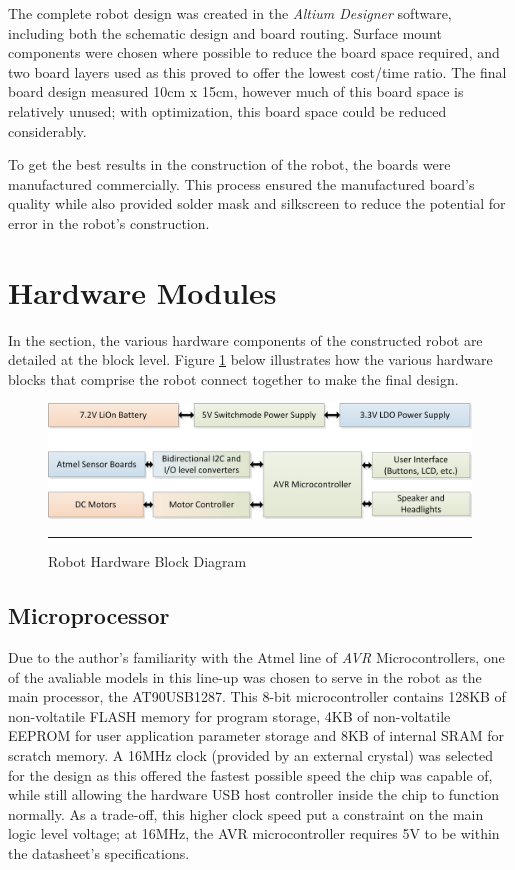 The complete robot design was created in the \textit{Altium Designer} software, including both the schematic design and board routing. Surface mount components were chosen where possible to reduce the board space required, and two board layers used as this proved to offer the lowest cost/time ratio. The final board design measured 10cm x 15cm, however much of this board space is relatively unused; with optimization, this board space could be reduced considerably.

To get the best results in the construction of the robot, the boards were manufactured commercially. This process ensured the manufactured board's quality while also provided solder mask and silkscreen to reduce the potential for error in the robot's construction.

\section{Hardware Modules}

In the section, the various hardware components of the constructed robot are detailed at the block level. Figure \ref{fig:robotblockhw} below illustrates how the various hardware blocks that comprise the robot connect together to make the final design.

\vspace{1em}

\begin{figure}[H]
	\centering
		\includegraphics[width=140mm]{./Figures/BlockDiagram.png}
	\rule{35em}{0.5pt}
	\caption[Hardware Block Diagram]{Robot Hardware Block Diagram}
	\label{fig:robotblockhw}
\end{figure}

\subsection{Microprocessor}

Due to the author's familiarity with the Atmel line of \textit{AVR} Microcontrollers, one of the avaliable models in this line-up was chosen to serve in the robot as the main processor, the AT90USB1287. This 8-bit microcontroller contains 128KB of non-voltatile FLASH memory for program storage, 4KB of non-voltatile EEPROM for user application parameter storage and 8KB of internal SRAM for scratch memory. A 16MHz clock (provided by an external crystal) was selected for the design as this offered the fastest possible speed the chip was capable of, while still allowing the hardware USB host controller inside the chip to function normally. As a trade-off, this higher clock speed put a constraint on the main logic level voltage; at 16MHz, the AVR microcontroller requires 5V to be within the datasheet's specifications.

